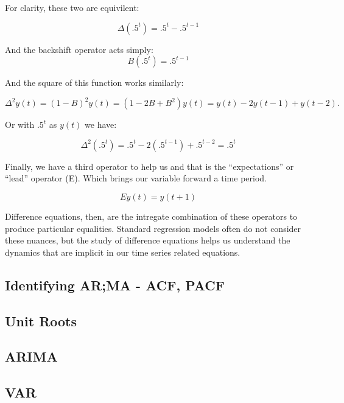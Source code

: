 \documentclass[12pt]{article}\usepackage[]{graphicx}\usepackage[]{color}
\begin{document}
\begin{flushleft}
For clarity, these two are equivilent:

\begin{equation}
\Delta (.5^t) = .5^t - .5^{t-1}
\end{equation}

And the backshift operator acts simply:
\begin{equation}
B(.5^t) = .5^{t-1}
\end{equation}

And the square of this function works similarly:

\begin{equation}
\Delta^2 y(t) = (1-B)^2 y(t) = (1-2B + B^2) y(t) = y(t) - 2y(t-1) + y(t-2).
\end{equation}

Or with $.5^t$ as $y(t)$ we have:

\begin{equation}
\Delta^2(.5^t) = .5^t - 2(.5^{t-1}) +.5^{t-2} = .5^t
\end{equation}

Finally, we have a third operator to help us and that is the ``expectations'' or ``lead'' operator (E). Which brings our variable forward a time period.

\begin{equation}
Ey(t) = y(t+1)
\end{equation}

Difference equations, then, are the intregate combination of these operators to produce particular equalities. Standard regression models often do not consider these nuances, but the study of difference equations helps us understand the dynamics that are implicit in our time series related equations.


\subsection{Identifying AR;MA - ACF, PACF}


\subsection{Unit Roots}


\subsection{ARIMA}


\subsection{VAR}


\end{flushleft}
\end{document}
